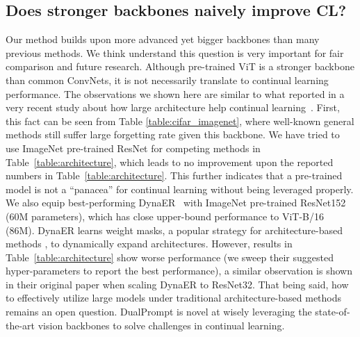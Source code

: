 \documentclass[runningheads]{llncs}
\newcommand{\sayna}[1]{\textcolor{blue}{Sayna: #1}}
\newcommand{\zizhaoz}[1]{\textcolor{green}{Zizhao: #1}}
\newcommand{\method}{DualPrompt\xspace}
\begin{document}
\subsection{Does stronger backbones naively improve CL?} 
Our method builds upon more advanced yet bigger backbones than many previous methods. We think understand this question is very important for fair comparison and future research. 
Although pre-trained ViT is a stronger backbone than common ConvNets, it is not necessarily translate to continual learning performance. The observations we shown here are similar to what reported in a very recent study about how large architecture help continual learning~\cite{mirzadeh2022architecture}. First, this fact can be seen from Table \ref{table:cifar_imagenet}, where well-known general methods still suffer large forgetting rate given this backbone.  %
We have tried to use ImageNet pre-trained ResNet for competing methods in Table~\ref{table:architecture}, which leads to no improvement upon the reported numbers in Table~\ref{table:architecture}. This further indicates that a pre-trained model is not a ``panacea'' for continual learning without being leveraged properly.
We also equip best-performing DynaER~\cite{yan2021dynamically} with ImageNet pre-trained ResNet152 (60M parameters), which has close upper-bound performance to ViT-B/16 (86M). DynaER learns weight masks, a popular strategy for architecture-based methods \cite{wortsman2020supermasks}, to dynamically expand architectures. 
However, results in Table~\ref{table:architecture} show worse performance (we sweep their suggested hyper-parameters to report the best performance), a similar observation is shown in their original paper when scaling DynaER to ResNet32. That being said, how to effectively utilize large models under traditional architecture-based methods remains an open question. \method is novel at wisely leveraging the state-of-the-art vision backbones to solve challenges in continual learning. 


\end{document}
